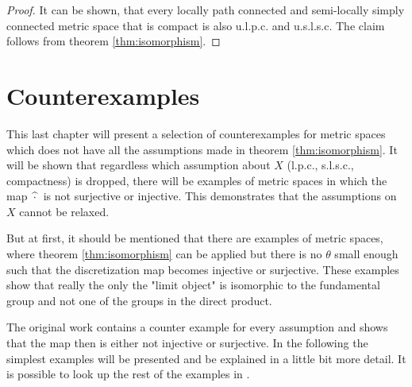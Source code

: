 \documentclass[a4paper, 11pt, twoside]{article}
\theoremstyle{break}
\theoremstyle{break}
\begin{document}
\begin{proof}
  It can be shown, that every locally path connected and semi-locally simply connected metric space that is compact is also u.l.p.c. and u.s.l.s.c. \cite[Lemma 5.14.4]{sakai2013geometric} The claim follows from theorem \ref{thm:isomorphism}.
\end{proof}

\section{Counterexamples}

This last chapter will present a selection of counterexamples for metric spaces which does not have all the assumptions made in theorem \ref{thm:isomorphism}.
It will be shown that regardless which assumption about $X$ (l.p.c., s.l.s.c., compactness) is dropped, 
there will be examples of metric spaces in which the map $\hspace*{2px}\widehat{\cdot}\hspace*{2px}$ is not surjective or injective.
This demonstrates that the assumptions on $X$ cannot be relaxed.

But at first, it should be mentioned that there are examples of metric spaces, where theorem \ref{thm:isomorphism} 
can be applied but there is no $\theta$ small enough such that the discretization map becomes injective or surjective.
These examples show that really the only the "limit object" is isomorphic to the fundamental group and not one of the groups in the direct product.

The original work contains a counter example for every assumption and shows that the map then is either not injective or surjective. 
In the following the simplest examples will be presented and be explained in a little bit more detail. It is possible to look up the rest of the examples in \cite[p. 8ff]{vigolo2018fundamental}. 
\end{document}
